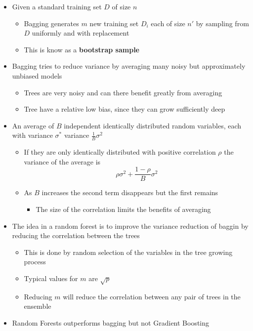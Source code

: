 \documentclass[a4, english]{article}
\begin{document}
\begin{itemize}
  \item Given a standard training set $D$ of size $n$ 
  \begin{itemize}
	  \item Bagging generates $m$ new training set $D_i$ each of size $n'$ by sampling from $D$ uniformly and with replacement
		\item This is know as a \textbf{bootstrap sample}
  \end{itemize} 
  \item Bagging tries to reduce variance by averaging many noisy but approximately unbiased models  
  \begin{itemize}
  	\item Trees are very noisy and can there benefit greatly from averaging 
    \item Tree have a relative low bias, since they can grow sufficiently deep
  \end{itemize}
  \item An average of $B$ independent identically distributed random variables, each with variance $\sigma^*$ variance $\frac1B \sigma^2$ 
  \begin{itemize}
  	\item If they are only identically distributed with positive correlation $\rho$ the variance of the average is 
    \begin{equation*}
      \rho \sigma^2 + \frac{1-\rho}B \sigma^2
    \end{equation*}
    \item As $B$ increases the second term disappears but the first remains   
    \begin{itemize}
      \item The size of the correlation limits the benefits of averaging
    \end{itemize}
  \end{itemize}
  \item The idea in a random forest is to improve the variance reduction of baggin by reducing the correlation between the trees
  \begin{itemize}
  	\item This is done by random selection of the variables in the tree growing process 
    \item Typical values for $m$ are $\sqrt p$ 
    \item Reducing $m$ will reduce the correlation between any pair of trees in the ensemble
  \end{itemize} 
  \item Random Forests outperforms bagging but not Gradient Boosting
\end{itemize}
\end{document}
